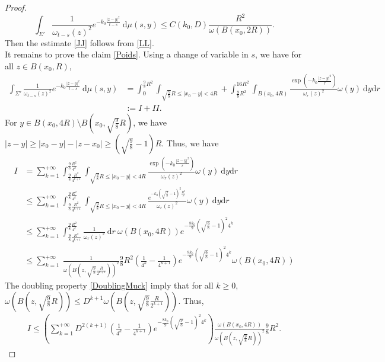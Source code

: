 \documentclass[12pt, letterpaper]{amsart}
\theoremstyle{definition}
\theoremstyle{remark}
\numberwithin{equation}{section}
\begin{document}
\begin{proof}
\begin{equation}
    \int_{\Sigma'} \frac{1}{\omega_{t-s}(z)^2} e ^{-k_0 \frac{\left | z-y \right |^2}{t-s}} \ \mathrm d\mu(s,y) \leq C(k_0,D) \frac{R^2}{\omega(B(x_0,2R))}.
\end{equation}
Then the estimate \eqref{JJ} follows from \eqref{LL}.\\
It remains to prove the claim \eqref{Poids}. Using a change of variable in $s$, we have for all $z \in B(x_0,R)$,
\begin{align*}
    \int_{\Sigma'} \frac{1}{\omega_{t-s}(z)^2} e ^{-k_0 \frac{\left | z-y \right |^2}{t-s}} \ \mathrm d\mu(s,y) &= \int_{0}^{\frac{9}{8}R^2}\int_{\sqrt{\frac{9}{8}}R\leq \left |x_0- y \right |<4R} + \int_{\frac{9}{8}R^2}^{16R^2}\int_{B(x_0,4R)} \frac{\exp(-k_0 \frac{\left |z- y \right |^2}{r})}{\omega_r(z)^2} \omega(y)\ \mathrm dy \mathrm d r \\&:= I +II.
\end{align*}
For $y \in B(x_0,4R)\setminus B(x_0,\sqrt{\frac{9}{8}}R)$, we have $\left | z-y \right | \ge \left | x_0-y \right |-\left | z-x_0 \right | \ge (\sqrt{\frac{9}{8}}-1)R$. Thus, we have
\begin{align*}
    I&= \sum_{k=1}^{+\infty} \int_{ \frac{9}{8}\frac{R^2}{4^{k+1}}}^{ \frac{9}{8}\frac{R^2}{4^k}}\int_{\sqrt{\frac{9}{8}}R\leq \left |x_0- y \right |<4R}  \frac{\exp(-k_0 \frac{\left | z-y \right |^2}{r})}{\omega_r(z)^2} \omega(y)\ \mathrm dy \mathrm d r
    \\&  \leq \sum_{k=1}^{+\infty} \int_{ \frac{9}{8}\frac{R^2}{4^{k+1}}}^{ \frac{9}{8}\frac{R^2}{4^k}}\int_{\sqrt{\frac{9}{8}}R\leq \left |x_0- y \right |<4R}  \frac{e^{-k_0 \left ( \sqrt{\frac{9}{8}}-1 \right )^2\frac{R^2}{r}}}{\omega_r(z)^2} \omega(y)\ \mathrm dy \mathrm d r
    \\& \leq \sum_{k=1}^{+\infty} \int_{ \frac{9}{8}\frac{R^2}{4^{k+1}}}^{ \frac{9}{8}\frac{R^2}{4^k}} \frac{1}{\omega_r(z)^2} \ \mathrm dr \ \omega(B(x_0,4R)) e^{-\frac{8k_0}{9}\left ( \sqrt{\frac{9}{8}}-1 \right )^2 4^k} 
    \\& \leq \sum_{k=1}^{+\infty} \ \frac{1}{\omega(B(z,\sqrt{\frac{9}{8}}\frac{R}{2^{k+1}}))^2} \frac{9}{8}R^2  \left ( \frac{1}{4^k}- \frac{1}{4^{k+1}} \right ) e^{-\frac{8k_0}{9}\left ( \sqrt{\frac{9}{8}}-1 \right )^2 4^k} \omega(B(x_0,4R))
\end{align*}
The doubling property \eqref{DoublingMuck} imply that for all $k\ge0$, $\omega(B(z,\sqrt{\frac{9}{8}}R)) \leq D^{k+1}\omega(B(z,\sqrt{\frac{9}{8}}\frac{R}{2^{k+1}}))$. Thus,
\begin{align*}
    I\leq \left (  \sum_{k=1}^{+\infty} D^{2(k+1)} \left ( \frac{1}{4^k}- \frac{1}{4^{k+1}} \right ) e^{-\frac{8k_0}{9}\left ( \sqrt{\frac{9}{8}}-1 \right )^2 4^k}\right )  \frac{\omega(B(x_0,4R))}{\omega(B(z,\sqrt{\frac{9}{8}}R))^2} \frac{9}{8} R^2.

\end{align*}
\end{proof}
\end{document}
